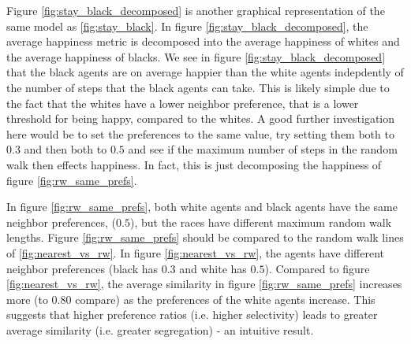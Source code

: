 \documentclass[11pt,twoside]{amsart}
\theoremstyle{theorem}
\theoremstyle{definition}
\theoremstyle{remark}
\begin{document}
Figure \ref{fig:stay_black_decomposed} is another graphical representation of the same model as \ref{fig:stay_black}. 
In figure \ref{fig:stay_black_decomposed}, the average happiness metric is decomposed into the average happiness of whites and the average happiness of blacks.
We see in figure \ref{fig:stay_black_decomposed} that the black agents are on average happier than the white agents indepdently of the number of steps that the black agents can take. 
This is likely simple due to the fact that the whites have a lower neighbor preference, that is a lower threshold for being happy, compared to the whites. 
A good further investigation here would be to set the preferences to the same value, try setting them both to $0.3$ and then both to $0.5$ and see if the maximum number of steps in the random walk then effects happiness. 
In fact, this is just decomposing the happiness of figure \ref{fig:rw_same_prefs}.

In figure \ref{fig:rw_same_prefs}, both white agents and black agents have the same neighbor preferences, ($0.5$), but the races have different maximum random walk lengths. Figure \ref{fig:rw_same_prefs} should be compared to the random walk lines of \ref{fig:nearest_vs_rw}. In figure \ref{fig:nearest_vs_rw}, the agents have different neighbor preferences (black has $0.3$ and white has $0.5$). 
Compared to figure \ref{fig:nearest_vs_rw}, the average similarity in figure \ref{fig:rw_same_prefs} increases more (to $0.80$ compare) as the preferences of the white agents increase. 
This suggests that higher preference ratios (i.e. higher selectivity) leads to greater average similarity (i.e. greater segregation) - an intuitive result.
\end{document}
